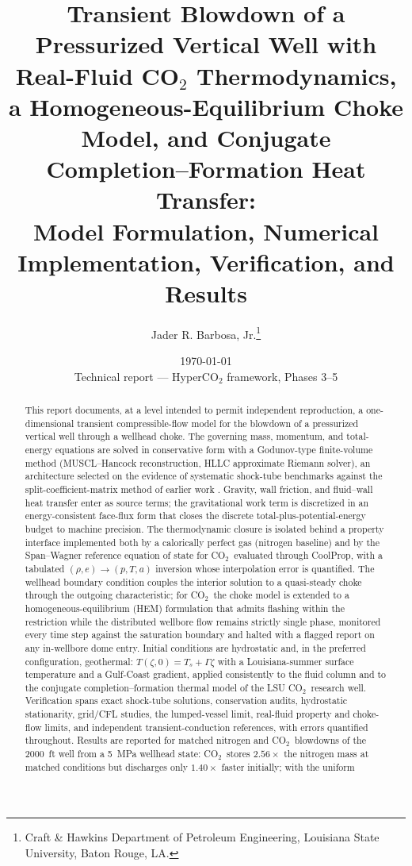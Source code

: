\documentclass[11pt]{article}
\title{Transient Blowdown of a Pressurized Vertical Well with Real-Fluid
CO$_2$ Thermodynamics, a Homogeneous-Equilibrium Choke Model, and Conjugate
Completion--Formation Heat Transfer:\\ Model Formulation, Numerical
Implementation, Verification, and Results}
\author{Jader R. Barbosa, Jr.\thanks{Craft \& Hawkins Department of
Petroleum Engineering, Louisiana State University, Baton Rouge, LA.}}
\date{\today\\[1ex]\small Technical report --- HyperCO$_2$ framework,
Phases 3--5}
\newcommand{\co}{CO$_2$}
\begin{document}
\maketitle

\begin{abstract}
This report documents, at a level intended to permit independent
reproduction, a one-dimensional transient compressible-flow model for the
blowdown of a pressurized vertical well through a wellhead choke. The
governing mass, momentum, and total-energy equations are solved in
conservative form with a Godunov-type finite-volume method
(MUSCL--Hancock reconstruction, HLLC approximate Riemann solver), an
architecture selected on the evidence of systematic shock-tube benchmarks
against the split-coefficient-matrix method of earlier work
\citep{gessner2010}. Gravity, wall friction, and fluid--wall heat
transfer enter as source terms; the gravitational work term is
discretized in an energy-consistent face-flux form that closes the
discrete total-plus-potential-energy budget to machine precision. The
thermodynamic closure is isolated behind a property interface
implemented both by a calorically perfect gas (nitrogen baseline) and by
the Span--Wagner reference equation of state for \co\ evaluated through
CoolProp, with a tabulated $(\rho,e)\!\to\!(p,T,a)$ inversion whose
interpolation error is quantified. The wellhead boundary condition
couples the interior solution to a quasi-steady choke through the
outgoing characteristic; for \co\ the choke model is extended to a
homogeneous-equilibrium (HEM) formulation that admits flashing within
the restriction while the distributed wellbore flow remains strictly
single phase, monitored every time step against the saturation boundary
and halted with a flagged report on any in-wellbore dome entry. Initial
conditions are hydrostatic and, in the preferred configuration,
geothermal: $T(\zeta,0)=T_s+\Gamma\zeta$ with a Louisiana-summer surface
temperature and a Gulf-Coast gradient, applied consistently to the fluid
column and to the conjugate completion--formation thermal model of the
LSU \co\ research well. Verification spans exact shock-tube solutions,
conservation audits, hydrostatic stationarity, grid/CFL studies, the
lumped-vessel limit, real-fluid property and choke-flow limits, and
independent transient-conduction references, with errors quantified
throughout. Results are reported for matched nitrogen and \co\
blowdowns of the \SI{2000}{ft} well from a \SI{5}{MPa} wellhead state:
\co\ stores $2.56\times$ the nitrogen mass at matched conditions but
discharges only $1.40\times$ faster initially; with the uniform

\end{abstract}
\end{document}
